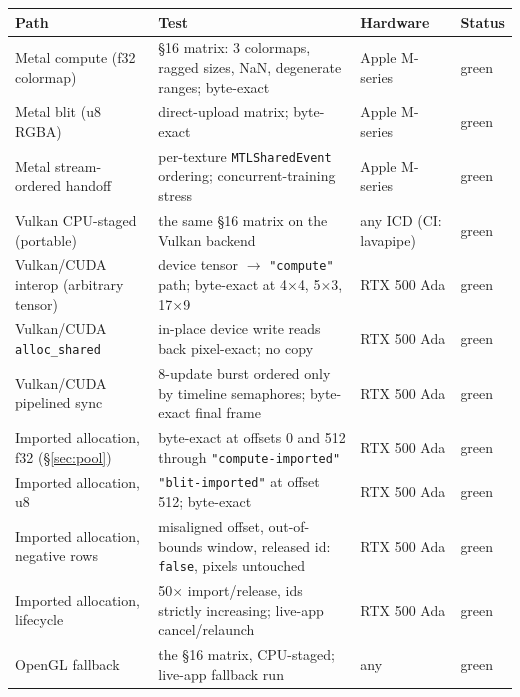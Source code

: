 \documentclass[11pt]{article}
\begin{document}
\begin{center}\footnotesize
\begin{tabular}{@{}p{}p{}p{}l@{}}
\toprule
Path & Test & Hardware & Status \\
\midrule
Metal compute (f32 colormap) & \S16 matrix: 3 colormaps, ragged sizes,
  NaN, degenerate ranges; byte-exact & Apple M-series & green \\
Metal blit (u8 RGBA) & direct-upload matrix; byte-exact & Apple M-series &
  green \\
Metal stream-ordered handoff & per-texture \texttt{MTLSharedEvent}
  ordering; concurrent-training stress & Apple M-series & green \\
\addlinespace
Vulkan CPU-staged (portable) & the same \S16 matrix on the Vulkan backend
  & any ICD (CI: lavapipe) & green \\
Vulkan/CUDA interop (arbitrary tensor) & device tensor
  $\rightarrow$ \texttt{"compute"} path; byte-exact at 4$\times$4,
  5$\times$3, 17$\times$9 & RTX 500 Ada & green \\
Vulkan/CUDA \texttt{alloc\_shared} & in-place device write reads back
  pixel-exact; no copy & RTX 500 Ada & green \\
Vulkan/CUDA pipelined sync & 8-update burst ordered only by timeline
  semaphores; byte-exact final frame & RTX 500 Ada & green \\
\addlinespace
Imported allocation, f32 (\S\ref{sec:pool}) & byte-exact at offsets 0 and
  512 through \texttt{"compute-imported"} & RTX 500 Ada & green \\
Imported allocation, u8 & \texttt{"blit-imported"} at offset 512;
  byte-exact & RTX 500 Ada & green \\
Imported allocation, negative rows & misaligned offset, out-of-bounds
  window, released id: \texttt{false}, pixels untouched & RTX 500 Ada &
  green \\
Imported allocation, lifecycle & 50$\times$ import/release, ids strictly
  increasing; live-app cancel/relaunch & RTX 500 Ada & green \\
\addlinespace
OpenGL fallback & the \S16 matrix, CPU-staged; live-app fallback run &
  any & green \\
\bottomrule
\end{tabular}
\end{center}
\end{document}
